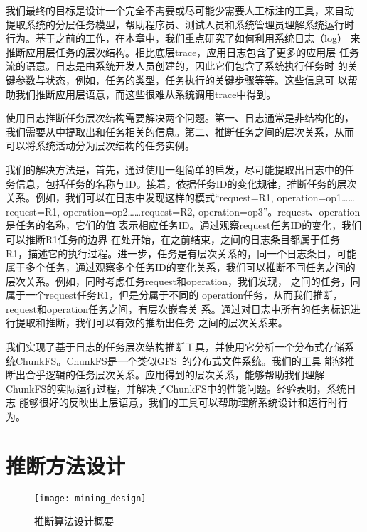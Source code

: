 我们最终的目标是设计一个完全不需要或尽可能少需要人工标注的工具，来自动
提取系统的分层任务模型，帮助程序员、测试人员和系统管理员理解系统运行时
行为。基于之前的工作，在本章中，我们重点研究了如何利用系统日志（log）
来推断应用层任务的层次结构。相比底层trace，应用日志包含了更多的应用层
任务流的语意。日志是由系统开发人员创建的，因此它们包含了系统执行任务时
的关键参数与状态，例如，任务的类型，任务执行的关键步骤等等。这些信息可
以帮助我们推断应用层语意，而这些很难从系统调用trace中得到。


使用日志推断任务层次结构需要解决两个问题。第一、日志通常是非结构化的，
我们需要从中提取出和任务相关的信息。第二、推断任务之间的层次关系，从而
可以将系统活动分为层次结构的任务实例。

我们的解决方法是，首先，通过使用一组简单的启发，尽可能提取出日志中的任
务信息，包括任务的名称与ID。接着，依据任务ID的变化规律，推断任务的层次
关系。例如，我们可以在日志中发现这样的模式“request=R1,
operation=op1\ldots \ldots request=R1,
operation=op2\ldots \ldots request=R2,
operation=op3”。request、operation是任务的名称，它们的值
表示相应任务ID。通过观察request任务ID的变化，我们可以推断R1任务的边界
在处开始，在之前结束，之间的日志条目都属于任务
R1，描述它的执行过程。进一步，任务是有层次关系的，同一个日志条目，可能
属于多个任务，通过观察多个任务ID的变化关系，我们可以推断不同任务之间的
层次关系。例如，同时考虑任务request和operation，我们发现，
之间的任务，同属于一个request任务R1，但是分属于不同的
operation任务，从而我们推断，request和operation任务之间，有层次嵌套关
系。通过对日志中所有的任务标识进行提取和推断，我们可以有效的推断出任务
之间的层次关系来。

我们实现了基于日志的任务层次结构推断工具，并使用它分析一个分布式存储系
统ChunkFS。ChunkFS是一个类似GFS~\cite{gfs}的分布式文件系统。我们的工具
能够推断出合乎逻辑的任务层次关系。应用得到的层次关系，能够帮助我们理解
ChunkFS的实际运行过程，并解决了ChunkFS中的性能问题。经验表明，系统日志
能够很好的反映出上层语意，我们的工具可以帮助理解系统设计和运行时行为。


\section{推断方法设计}
\label{sec:lm_design}

\begin{figure}[htbp]
  \centering
  \begin{minipage}{0.9\linewidth}
    \centering
    \texttt{[image: mining\_design]}
    \caption{推断算法设计概要}
    \label{fig:logmining_design}
  \end{minipage}
\end{figure}

